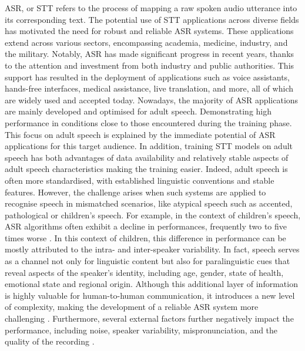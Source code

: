 \label{chap:Chapter2}
\cleardoublepage
\ac{ASR}, or \ac{STT} refers to the process of mapping a raw spoken audio utterance into its corresponding text. 
The potential use of \ac{STT} applications across diverse fields has motivated the need for robust and reliable \ac{ASR} systems. These applications extend across various sectors, encompassing academia, medicine, industry, and the military. Notably, \ac{ASR} has made significant progress in recent years, thanks to the attention and investment from both industry and public authorities. This support has resulted in the deployment of applications such as voice assistants, hands-free interfaces, medical assistance, live translation, and more, all of which are widely used and accepted today.
Nowadays, the majority of \ac{ASR} applications are mainly developed and optimised for adult speech. Demonstrating high performance in conditions close to those encountered during the training phase. This focus on adult speech is explained by the immediate potential of \ac{ASR} applications for this target audience. In addition, training \ac{STT} models on adult speech has both advantages of data availability and relatively stable aspects of adult speech characteristics making the training easier. Indeed, adult speech is often more standardised, with established linguistic conventions and stable features.
However, the challenge arises when such systems are applied to recognise speech in mismatched scenarios, like atypical speech such as accented, pathological or children's speech. For example, in the context of children's speech, \ac{ASR} algorithms often exhibit a decline in performances, frequently two to five times worse \cite{childrenSpeechWorse}. In this context of children, this difference in performance can be mostly attributed to the intra- and inter-speaker variability. In fact, speech serves as a channel not only for linguistic content but also for paralinguistic cues that reveal aspects of the speaker's identity, including age, gender, state of health, emotional state and regional origin. Although this additional layer of information is highly valuable for human-to-human communication, it introduces a new level of complexity, making the development of a reliable \ac{ASR} system more challenging \cite{li2023asr}.
Furthermore, several external factors further negatively impact the performance, including noise, speaker variability, mispronunciation, and the quality of the recording \cite{li2014overview,king2017robust}.


